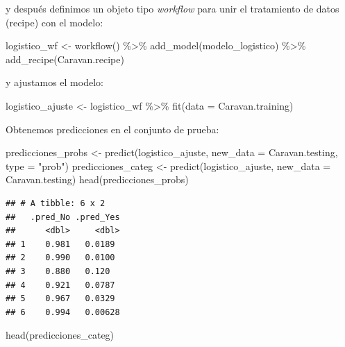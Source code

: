 \documentclass[
  12pt,
]{book}
\newenvironment{Shaded}{\begin{snugshade}}{\end{snugshade}}
\newcommand{\AttributeTok}[1]{\textcolor[rgb]{0.77,0.63,0.00}{#1}}
\newcommand{\FunctionTok}[1]{\textcolor[rgb]{0.00,0.00,0.00}{#1}}
\newcommand{\NormalTok}[1]{#1}
\newcommand{\OtherTok}[1]{\textcolor[rgb]{0.56,0.35,0.01}{#1}}
\newcommand{\SpecialCharTok}[1]{\textcolor[rgb]{0.00,0.00,0.00}{#1}}
\newcommand{\StringTok}[1]{\textcolor[rgb]{0.31,0.60,0.02}{#1}}
\begin{document}
y después definimos un objeto tipo \emph{workflow} para unir el
tratamiento de datos (recipe) con el modelo:

\begin{Shaded}
\begin{Highlighting}[]
\NormalTok{logistico\_wf }\OtherTok{\textless{}{-}} \FunctionTok{workflow}\NormalTok{() }\SpecialCharTok{\%\textgreater{}\%}
    \FunctionTok{add\_model}\NormalTok{(modelo\_logistico) }\SpecialCharTok{\%\textgreater{}\%}
    \FunctionTok{add\_recipe}\NormalTok{(Caravan.recipe)}
\end{Highlighting}
\end{Shaded}

y ajustamos el modelo:

\begin{Shaded}
\begin{Highlighting}[]
\NormalTok{logistico\_ajuste }\OtherTok{\textless{}{-}}\NormalTok{ logistico\_wf }\SpecialCharTok{\%\textgreater{}\%}
    \FunctionTok{fit}\NormalTok{(}\AttributeTok{data =}\NormalTok{ Caravan.training)}
\end{Highlighting}
\end{Shaded}

Obtenemos predicciones en el conjunto de prueba:

\begin{Shaded}
\begin{Highlighting}[]
\NormalTok{predicciones\_probs }\OtherTok{\textless{}{-}} \FunctionTok{predict}\NormalTok{(logistico\_ajuste, }\AttributeTok{new\_data =}\NormalTok{ Caravan.testing,}
    \AttributeTok{type =} \StringTok{"prob"}\NormalTok{)}
\NormalTok{predicciones\_categ }\OtherTok{\textless{}{-}} \FunctionTok{predict}\NormalTok{(logistico\_ajuste, }\AttributeTok{new\_data =}\NormalTok{ Caravan.testing)}
\FunctionTok{head}\NormalTok{(predicciones\_probs)}
\end{Highlighting}
\end{Shaded}

\begin{verbatim}
## # A tibble: 6 x 2
##   .pred_No .pred_Yes
##      <dbl>     <dbl>
## 1    0.981   0.0189 
## 2    0.990   0.0100 
## 3    0.880   0.120  
## 4    0.921   0.0787 
## 5    0.967   0.0329 
## 6    0.994   0.00628
\end{verbatim}

\begin{Shaded}
\begin{Highlighting}[]
\FunctionTok{head}\NormalTok{(predicciones\_categ)}
\end{Highlighting}
\end{Shaded}
\end{document}
